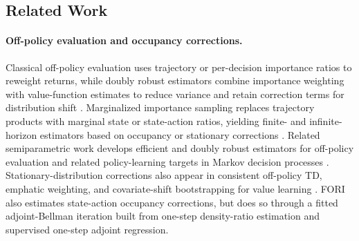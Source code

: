 \documentclass{article}
\newcommand{\1}{\mathbf{1}}
\theoremstyle{plain}
\theoremstyle{definition}
\theoremstyle{remark}
\begin{document}
\subsection{Related Work}

\paragraph{Off-policy evaluation and occupancy corrections.}
Classical off-policy evaluation uses trajectory or per-decision importance
ratios to reweight returns, while doubly robust estimators combine importance
weighting with value-function estimates to reduce variance and retain correction
terms for distribution shift
\citep{thomasBrunskill2016DataEfficientOPE,jiangLi2016DoublyRobust,kallusUehara2020DRL_ICML,kallusUehara2020DoubleRL}.
Marginalized importance sampling replaces trajectory products with marginal
state or state-action ratios, yielding finite- and infinite-horizon estimators
based on occupancy or stationary corrections
\citep{xieEtAl2019MarginalizedIS,yinWang2020EfficientTabularOPE,liuEtAl2018InfiniteHorizonOPE}.
Related semiparametric work develops efficient and doubly robust estimators for
off-policy evaluation and related policy-learning targets in Markov decision
processes
\citep{kallusUehara2019IntrinsicOPE,kallusUehara2020DRL_ICML,kallusUehara2020DoubleRL,kallusUehara2020PolicyGradients,kallusUehara2020DeterministicPolicyDR,kallusUehara2022BreakingHorizonDRL,kallusUehara2024NaturalPolicies,ueharaShiKallus2022OPEReview,vanDerLaanEtAl2025AutomaticDRL,vanDerLaanKallusBibaut2025ClassificationIRL,vanDerLaanBibautKallus2025EfficientIRL}.
Stationary-distribution corrections also appear in consistent off-policy TD,
emphatic weighting, and covariate-shift bootstrapping for value learning
\citep{hallakMannor2017COPTD,suttonEtAl2016EmphaticTD,geladaBellemare2019CovariateShift,pattersonEtAl2022GeneralizedPBE}.
\textsc{FORI} also estimates state-action occupancy corrections, but does so
through a fitted adjoint-Bellman iteration built from one-step density-ratio
estimation and supervised one-step adjoint regression.
\end{document}
